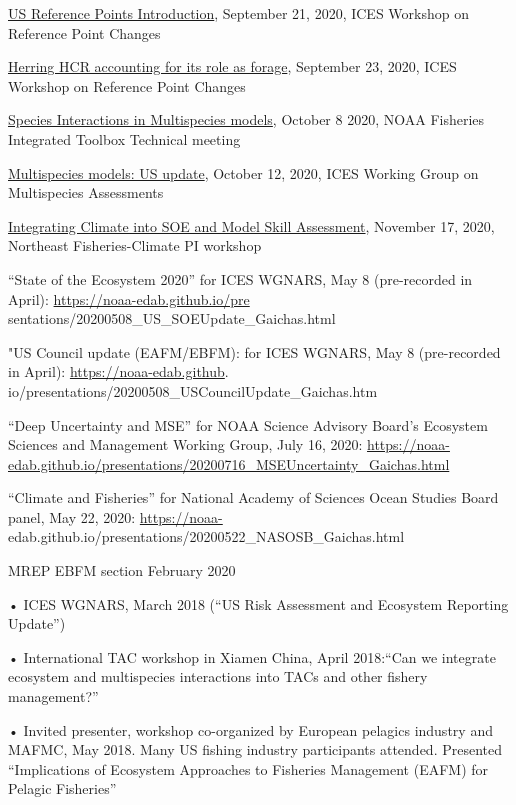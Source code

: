\documentclass[11pt, a4paper]{awesome-cv}
\begin{document}
\href{https://noaa-edab.github.io/presentations/20200921_USrefpts_WKRPchange_Gaichas.html\#1}{US
Reference Points Introduction}, September 21, 2020, ICES Workshop on
Reference Point Changes

\href{https://noaa-edab.github.io/presentations/20200923_herringWKRPchange_Gaichas.html\#1}{Herring
HCR accounting for its role as forage}, September 23, 2020, ICES
Workshop on Reference Point Changes

\href{https://noaa-edab.github.io/presentations/20201008_FIT_MSmods_Gaichas.html\#1}{Species
Interactions in Multispecies models}, October 8 2020, NOAA Fisheries
Integrated Toolbox Technical meeting

\href{https://noaa-edab.github.io/presentations/20201012_WGSAM_USupdate_Gaichas.html\#1}{Multispecies
models: US update}, October 12, 2020, ICES Working Group on Multispecies
Assessments

\href{https://docs.google.com/presentation/d/184Af-afIIv-aGSRT6-Ed9SRmqf5n8YOO/edit\#slide=id.p1}{Integrating
Climate into SOE and Model Skill Assessment}, November 17, 2020,
Northeast Fisheries-Climate PI workshop

``State of the Ecosystem 2020'' for ICES WGNARS, May 8 (pre-recorded in
April): \url{https://noaa-edab.github.io/pre}
sentations/20200508\_US\_SOEUpdate\_Gaichas.html

"US Council update (EAFM/EBFM): for ICES WGNARS, May 8 (pre-recorded in
April): \url{https://noaa-edab.github}.
io/presentations/20200508\_USCouncilUpdate\_Gaichas.htm

``Deep Uncertainty and MSE'' for NOAA Science Advisory Board's Ecosystem
Sciences and Management Working Group, July 16, 2020:
\url{https://noaa-edab.github.io/presentations/20200716_MSEUncertainty_Gaichas.html}

``Climate and Fisheries'' for National Academy of Sciences Ocean Studies
Board panel, May 22, 2020: \url{https://noaa-}
edab.github.io/presentations/20200522\_NASOSB\_Gaichas.html

MREP EBFM section February 2020

• ICES WGNARS, March 2018 (``US Risk Assessment and Ecosystem Reporting
Update'')

• International TAC workshop in Xiamen China, April 2018:``Can we
integrate ecosystem and multispecies interactions into TACs and other
fishery management?''

• Invited presenter, workshop co-organized by European pelagics industry
and MAFMC, May 2018. Many US fishing industry participants attended.
Presented ``Implications of Ecosystem Approaches to Fisheries Management
(EAFM) for Pelagic Fisheries''
\end{document}

